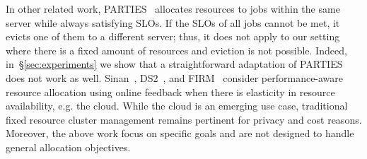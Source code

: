 In other related work,
PARTIES~\cite{chen2019parties} 
allocates resources to jobs within the same server while always satisfying SLOs.
If the SLOs of all jobs cannot be met, it evicts one of them to a different server;
thus, it does not apply to our setting where there is a fixed amount of
resources and eviction is not possible.
Indeed, in~\S\ref{sec:experiments} we show that a straightforward adaptation of PARTIES  does not work as well.
% 
Sinan~\cite{zhang2021sinan}, DS2~\cite{kalavri2018three}, 
and FIRM~\cite{qiu2020firm}
consider performance-aware resource allocation using online feedback when there is elasticity in
resource availability, %
e.g. the cloud. 
While the cloud is an emerging use case, traditional fixed resource cluster management
remains pertinent for privacy and cost reasons. %
Moreover, the above work focus on specific goals and are not designed to handle
general allocation objectives. 






